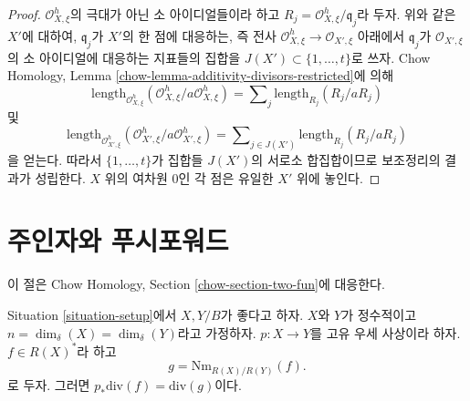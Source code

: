 \begin{proof}
$\mathcal{O}_{X, \xi}^h$의 극대가 아닌 소 아이디얼들이라 하고
$R_j = \mathcal{O}_{X, \xi}^h/\mathfrak q_j$라 두자.
위와 같은 $X'$에 대하여, $\mathfrak q_j$가 $X'$의 한 점에 대응하는,
즉 전사
$\mathcal{O}_{X, \xi}^h \to \mathcal{O}_{X', \xi}$ 아래에서
$\mathfrak q_j$가 $\mathcal{O}_{X', \xi}$의 소 아이디얼에 대응하는
지표들의 집합을 $J(X') \subset \{1, \ldots, t\}$로 쓰자.
Chow Homology, Lemma
\ref{chow-lemma-additivity-divisors-restricted}에 의해
$$
\text{length}_{\mathcal{O}_{X, \xi}^h}
(\mathcal{O}_{X, \xi}^h/a \mathcal{O}_{X, \xi}^h) =
\sum\nolimits_j \text{length}_{R_j}(R_j/a R_j)
$$
및
$$
\text{length}_{\mathcal{O}_{X', \xi}^h}
(\mathcal{O}_{X', \xi}^h/a \mathcal{O}_{X', \xi}^h) =
\sum\nolimits_{j \in J(X')} \text{length}_{R_j}(R_j/a R_j)
$$
을 얻는다. 따라서 $\{1, \ldots, t\}$가 집합들 $J(X')$의 서로소
합집합이므로 보조정리의 결과가 성립한다. $X$ 위의 여차원 $0$인
각 점은 유일한 $X'$ 위에 놓인다.
\end{proof}

\section{주인자와 푸시포워드}
\label{section-two-fun}

\noindent
이 절은 Chow Homology, Section \ref{chow-section-two-fun}에 대응한다.

\begin{lemma}
\label{lemma-proper-pushforward-alteration}
Situation \ref{situation-setup}에서 $X, Y/B$가 좋다고 하자.
$X$와 $Y$가 정수적이고
$n = \dim_\delta(X) = \dim_\delta(Y)$라고 가정하자.
$p : X \to Y$를 고유 우세 사상이라 하자.
$f \in R(X)^*$라 하고
$$
g = \text{Nm}_{R(X)/R(Y)}(f).
$$
로 두자. 그러면 $p_*\text{div}(f) = \text{div}(g)$이다.
\end{lemma}

